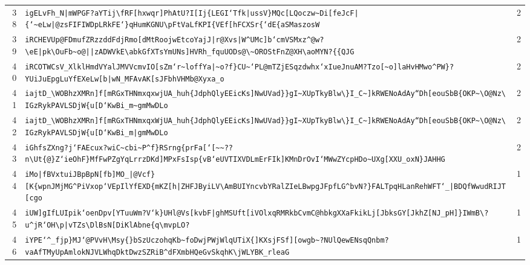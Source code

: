 \begin{xltabular}{\textwidth}{@{} r >{\raggedright\arraybackslash}X r @{}}
        38 & \texttt{igELvFh\_N|mWPGF?aYTij\textbackslash{}fRF[hxwqr]PhAtU?I[Ij\{LEGI`Tfk|ussV\}MQc[LQoczw\textasciitilde{}Di[feJcF|\{`\textasciitilde{}eLw|@zsFIFIWDpLRkFE`\}qHumKGNU\textbackslash{}pFtVaLfKPI\{VEf[hFCXSr\{`dE\{aSMaszosW} & 2 \\
        39 & \texttt{iRCHEVUp@FDmufZRzzddFdjRmo[dMtRoojwEtcoYajJ|r@Xvs|W\textasciicircum{}UMc]b`cmVSMxz\textasciicircum{}@w?\textbackslash{}eE|pk\textbackslash{}OuFb\textasciitilde{}o@||zADWVkE\textbackslash{}abkGfXTsYmUNs]HVRh\_fquUODs@\textbackslash{}\textasciitilde{}OROStFnZ@XH\textbackslash{}aoMYN?\{\{QJG} & 2 \\
        40 & \texttt{iRCOTWCsV\_XlklHmdVYalJMVVcmvIO[sZm`r\textasciitilde{}loffYa|\textasciitilde{}o?f\}CU\textasciitilde{}`PL@mTZjESqzdwhx`xIueJnuAM?Tzo[\textasciitilde{}o]laHvHMwo\textasciicircum{}PW\}?YUiJuEpgLuYfEXeLw[b|wN\_MFAvAK[sJFbhVHMb@Xyxa\_o} & 2 \\
        41 & \texttt{iajtD\_\textbackslash{}WOBhzXMRn]f[mRGxTHNmxqxwjUA\_huh\{JdphQlyEEicKs]NwUVad\}\}gI\textasciitilde{}XUpTkyBlw\textbackslash{}\}I\_C\textasciitilde{}]kRWENoAdAy``Dh[eouSbB\{OKP\textasciitilde{}\textbackslash{}O@Nz\textbackslash{}IGzRykPAVLSDjW\{u[D`KwBi\_m\textasciitilde{}gmMwDLo} & 2 \\
        42 & \texttt{iajtD\_\textbackslash{}WOBhzXMRn]f[mRGxTHNmxqxWjUA\_huh\{JdphQlyEEicKs]NwUVad\}\}gI\textasciitilde{}XUpTkyBlw\textbackslash{}\}I\_C\textasciitilde{}]kRWENoAdAy``Dh[eouSbB\{OKP\textasciitilde{}\textbackslash{}O@Nz\textbackslash{}IGzRykPAVLSDjW\{u[D`KwBi\_m|gmMwDLo} & 2 \\
        43 & \texttt{iGhfsZXng?j`FAEcux?wiC\textasciitilde{}cbi\textasciitilde{}P\textasciicircum{}f\}RSrng\{prFa[`[\textasciitilde{}\textasciitilde{}??n\textbackslash{}Ut\{@\}Z`ieOhF\}MfFwPZgYqLrrzDKd]MPxFsIsp\{vB`eUVTIXVDLmErFIk]KMnDrOvI`MWwZYcpHDo\textasciitilde{}UXg[XXU\_oxN\}JAHHG} & 2 \\
        44 & \texttt{iMo|fBVxtuiJBpBpN[fb]MO\_|@Vcf\}[K\{wpnJMjMG\textasciicircum{}PiVxop`VEpIlYfEXD\{mKZ[h|ZHFJByiLV\textbackslash{}AmBUIYncvbYRalZIeLBwpgJFpfLG\textasciicircum{}bvN?\}FALTpqHLanRehWFT`\_|BDQfWwudRIJT[cgo} & 1 \\
        45 & \texttt{iUW]gIfLUIpik`oenDpv[YTuuWm?V`k\}UHl@Vs[kvbF|ghMSUft[iVOlxqRMRkbCvmC@hbkgXXaFkikLj[JbksGY[JkhZ[NJ\_pH]\}IWmB\textbackslash{}?u\textasciicircum{}jR`OH\textbackslash{}p|vTZs\textbackslash{}DlBsN[DiKlAbne\{q\textbackslash{}mvpLO?} & 1 \\
        46 & \texttt{iYPE`\textasciicircum{}\_fjp\}MJ`@PVvH\textbackslash{}Msy\{\}bSzUczohqKb\textasciitilde{}foDwjPWjWlqUTiX\{]KXsjFSf][owgb\textasciitilde{}?NUlQewENsqQnbm?vaAfTMyUpAmlokNJVLWhqDktDwzSZRiB\textasciicircum{}dFXmbHQeGvSkqhK\textbackslash{}jWLYBK\_rleaG} & 1 \\

\end{xltabular}
